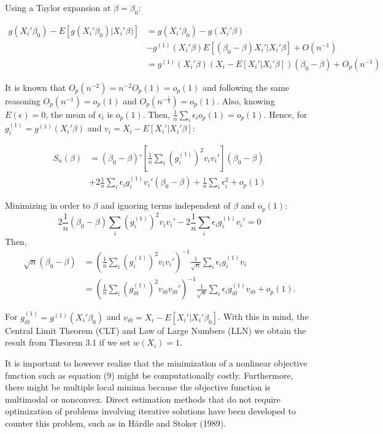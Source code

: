 \documentclass[a4paper]{article}
\begin{document}
Using a Taylor expansion at $\beta = \beta_0$:

\begin{align*}
g(X_i'\beta_0) - E[g(X_i'\beta_0)|X_i'\beta)] & = g(X_i'\beta_0) - g(X_i'\beta) \\
											 & - g^{(1)}(X_i'\beta)E[(\beta_0 - \beta)X_i'|X_i'\beta] + O(n^{-1}) \\
				                              & = g^{(1)}(X_i'\beta)( X_i - E[X_i'|X_i'\beta])(\beta_0 - \beta) + O_p(n^{-1})
\end{align*}


It is known that $O_p(n^{-2}) = n^{-2}O_p(1) = o_p(1)$ and following the same reasoning $O_p(n^{-1}) = o_p(1)$ and $O_p(n^{-\frac{1}{2}}) = o_p(1)$. Also, knowing $E(\epsilon) = 0$, the mean of $\epsilon_i$ is $o_p(1)$. Then, $\frac{1}{n}\sum_i\epsilon_io_p(1) = o_p(1)$. Hence, for $g_{i}^{(1)} = g^{(1)}(X_i'\beta)$ and $v_i = X_i - E[X_i'|X_i'\beta]$:

\begin{align*}
S_{n}(\beta) & = (\beta_0 - \beta)'\left[\frac{1}{n}\sum_i (g_i^{(1)})^2v_iv_i'\right](\beta_0 - \beta) \\
             & + 2\frac{1}{n}\sum_i\epsilon_ig_i^{(1)}v_i'(\beta_0 - \beta) + \frac{1}{n}\sum_i \epsilon_i^2 + o_p(1)
\end{align*}

Minimizing in order to $\beta$ and ignoring terms independent of $\beta$ and $o_p(1)$:
\[2\frac{1}{n}(\beta_0 - \beta)\sum_i(g_{i}^{(1)})^2v_iv_i' - 2\frac{1}{n}\sum_i\epsilon_ig_i^{(1)}v_i' = 0 \]
Then, 
\begin{align*}
\sqrt{n}(\beta_0 - \beta) & = (\frac{1}{n}\sum_i(g_{i}^{(1)})^2v_iv_i')^{-1}\frac{1}{\sqrt{n}}\sum_i\epsilon_i g_{i}^{(1)}v_i \\
     					  & = (\frac{1}{n}\sum_i(g_{i0}^{(1)})^2v_{i0}v_{i0}')^{-1}\frac{1}{\sqrt{n}}\sum_i\epsilon_i g_{i0}^{(1)}v_{i0} + o_p(1).
\end{align*}

For $g_{i0}^{(1)} = g^{(1)}(X_i'\beta_0)$ and $v_{i0} = X_i - E[X_i'|X_i'\beta_0]$. With this in mind, the Central Limit Theorem (CLT) and Law of Large Numbers (LLN) we obtain the result from Theorem 3.1 if we set $w(X_i) = 1$.

It is important to however realize that the minimization of a nonlinear objective function such as equation (9) might be computationally costly. Furthermore, there might be multiple local minima because the objective function is multimodal or nonconvex. Direct estimation methods that do not require optimization of problems involving iterative solutions have been developed to counter this problem, such as in H{\"a}rdle and Stoker (1989).
\end{document}
